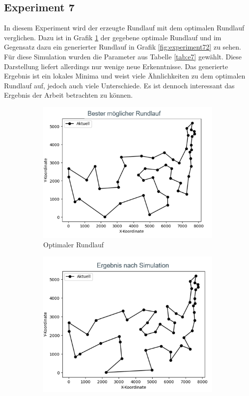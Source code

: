 \subsection{Experiment 7}
In diesem Experiment wird der erzeugte Rundlauf mit dem optimalen Rundlauf verglichen. Dazu ist in Grafik \ref{fig:experiment71} der gegebene optimale Rundlauf und im Gegensatz dazu ein generierter Rundlauf in Grafik \ref{fig:experiment72} zu sehen. Für diese Simulation wurden die Parameter aus Tabelle \ref{tab:e7} gewählt. Diese Darstellung liefert allerdings nur wenige neue Erkenntnisse. Das generierte Ergebnis ist ein lokales Minima und weist viele Ähnlichkeiten zu dem optimalen Rundlauf auf, jedoch auch viele Unterschiede. Es ist dennoch interessant das Ergebnis der Arbeit betrachten zu können.

\begin{figure}
	\centering
	\begin{subfigure}[Optimum]{0.49\textwidth}
		\includegraphics[width=\textwidth]{img/Vortrag/experiment7_1.png}
		\caption{Optimaler Rundlauf}
		\label{fig:experiment71}
	\end{subfigure}
	\begin{subfigure}[Simulation]{0.49\textwidth}
		\includegraphics[width=\textwidth]{img/Vortrag/experiment7_2.png}

\end{subfigure}
\end{figure}

